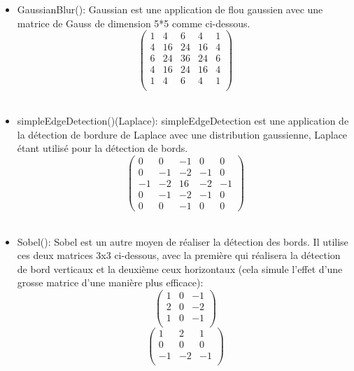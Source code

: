 \documentclass[12pt]{article}
\begin{document}
    \begin{itemize}
        
        \item GaussianBlur():
        Gaussian est une application de flou gaussien avec une matrice de Gauss de dimension 5*5 comme ci-dessous.
            \begin{equation}
                \begin{pmatrix}
                    1 & 4 & 6 & 4& 1\\
                    4 & 16 & 24 & 16 & 4\\
                    6 & 24 & 36 & 24 & 6\\
                    4 & 16 & 24 & 16 & 4\\
                    1 & 4 & 6 & 4 & 1\\
                \end{pmatrix}
            \end{equation} 
        \\
        \item simpleEdgeDetection()(Laplace): 
        simpleEdgeDetection est une application de la détection de bordure de Laplace avec une distribution gaussienne, Laplace étant utilisé pour la détection de bords.
        \begin{equation}
            \begin{pmatrix}
                0 &  0 & -1 &  0 &  0\\
                0 & -1 & -2 & -1 &  0\\
                -1 & -2 & 16 & -2 & -1\\
                0 & -1 & -2 & -1 &  0\\
                0 &  0 & -1 &  0 &  0
            \end{pmatrix}
        \end{equation} 
        \\
        \item Sobel():
        Sobel est un autre moyen de réaliser la détection des bords.
        Il utilise ces deux matrices 3x3 ci-dessous, avec la première qui réalisera la détection de bord verticaux et la deuxième ceux horizontaux
        (cela simule l'effet d'une grosse matrice d'une manière plus efficace):
        \begin{equation}
            \begin{pmatrix}
                1 &  0 & -1 \\
                2 & 0 & -2 \\
                1 & 0 & -1 \\
            \end{pmatrix}
        \end{equation} 
        \begin{equation}
            \begin{pmatrix}
                1 &  2 & 1 \\
                0 & 0 & 0 \\
                -1 & -2 & -1 \\
            \end{pmatrix}
        \end{equation} 
        

\end{itemize}
\end{document}

